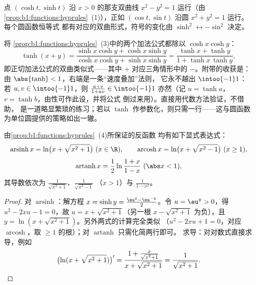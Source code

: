 \begin{remark}[为什么叫“双曲”？]
点 $(\cosh t, \sinh t)$ 沿 $x > 0$ 的那支双曲线
$x^2 - y^2 = 1$ 运行（由
\cref{prop:b1:functions:hyprules}~(1)），正如 $(\cos t, \sin
t)$ 沿圆 $x^2 + y^2 = 1$ 运行。每个圆函数恒等式
都有对应的双曲形式，符号的变化由
$\sinh^2 \leftrightarrow -\sin^2$ 决定。
\end{remark}

\begin{example}\label{ex:b1:functions:tanhadd}
将
\cref{prop:b1:functions:hyprules}~(3)中的两个加法公式都除以 $\cosh x\cosh y$：
\[
\tanh(x + y)
= \frac{\sinh x\cosh y + \cosh x\sinh y}
{\cosh x\cosh y + \sinh x\sinh y}
= \frac{\tanh x + \tanh y}{1 + \tanh x\,\tanh y} ,
\]
即正切加法公式的双曲类似式——其中
$+$ 对应三角情形中的 $-$。附带的收获是：由 $\abs{\tanh}
< 1$，右端是一条“速度叠加”法则，
它永不越出 $\intoo{-1}1$：若 $u, v \in \intoo{-1}1$，则
$\frac{u + v}{1 + uv} \in \intoo{-1}1$ 亦然（记 $u = \tanh
a$，$v = \tanh b$，由性可作此设，并将公式
倒过来用）。直接用代数方法验证，不借助，
是一道略显繁琐的练习；若以
$\tanh$ 作参数化，则只需一行——这与圆函数
为单位圆提供的策略如出一辙。
\end{example}

\begin{proposition}[反双曲函数]\label{prop:b1:functions:invhyp}
由\cref{prop:b1:functions:hyprules}~(4)所保证的反函数
均有如下显式表达式：
\[
\operatorname{arsinh} x = \ln\bigl(x + \sqrt{x^2 + 1}\bigr)
\ (x \in \R),
\qquad
\operatorname{arcosh} x = \ln\bigl(x + \sqrt{x^2 - 1}\bigr)
\ (x \geq 1),
\]
\[
\operatorname{artanh} x = \frac 12 \ln\frac{1 + x}{1 - x}
\ (\abs x < 1),
\]
其导数依次为 $\frac{1}{\sqrt{x^2+1}}$、$\frac{1}{\sqrt{x^2-1}}$
（$x > 1$）与 $\frac{1}{1 - x^2}$。
\end{proposition}

\begin{proof}
对 $\operatorname{arsinh}$：解方程 $x = \sinh y = \frac{\eu^y -
\eu^{-y}}{2}$。令 $u = \eu^y > 0$，得 $u^2 - 2xu - 1 = 0$，故 $u = x
+ \sqrt{x^2 + 1}$（另一根 $x - \sqrt{x^2+1}$ 为负），且 $y =
\ln(x + \sqrt{x^2+1})$。另外两式的计算完全类似
（$u^2 - 2xu + 1 = 0$，对应 $\operatorname{arcosh}$，取
$\geq 1$ 的根）；对 $\operatorname{artanh}$ 只需化简两行即可。
求导：对对数式直接求导，例如
\[
\bigl(\ln(x + \sqrt{x^2+1})\bigr)'
= \frac{1 + \frac{x}{\sqrt{x^2+1}}}{x + \sqrt{x^2+1}}
= \frac{1}{\sqrt{x^2 + 1}} . \qedhere
\]
\end{proof}

